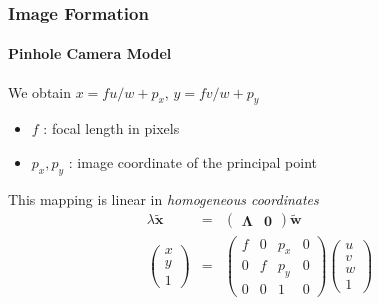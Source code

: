 \documentclass[xetex,professionalfont]{beamer}
\renewcommand{\vec}[1]{\ensuremath{\mathbf{#1}}}
\newcommand{\vw}{\vec{w}}
\newcommand{\vx}{\vec{x}}
\newcommand{\intr}{\boldsymbol{\Lambda}}
\begin{document}
\begin{frame}
\frametitle{Image Formation}
\framesubtitle{Pinhole Camera Model}

We obtain $x=fu/w+p_x$, $y=fv/w+p_y$ %
\begin{itemize}
    \item $f$ : focal length in pixels %
    \item $p_x,p_y$ : image coordinate of the principal point
\end{itemize}

\bigskip
This mapping is linear in \emph{homogeneous coordinates} %
\begin{eqnarray*}
    \lambda
    \tilde{\vx} &=& %
    \begin{pmatrix}
         \intr & \vec{0} %
     \end{pmatrix} \tilde{\vw} \\
    \begin{pmatrix}
        x \\ y \\ 1
    \end{pmatrix} &=& 
    \begin{pmatrix}
        f & 0 & p_x & 0 \\ 0 & f & p_y & 0 \\ 0 & 0 & 1 & 0
    \end{pmatrix}
    \begin{pmatrix}
        u \\ v \\ w \\ 1
    \end{pmatrix}
\end{eqnarray*} %

\end{frame}
\end{document}

